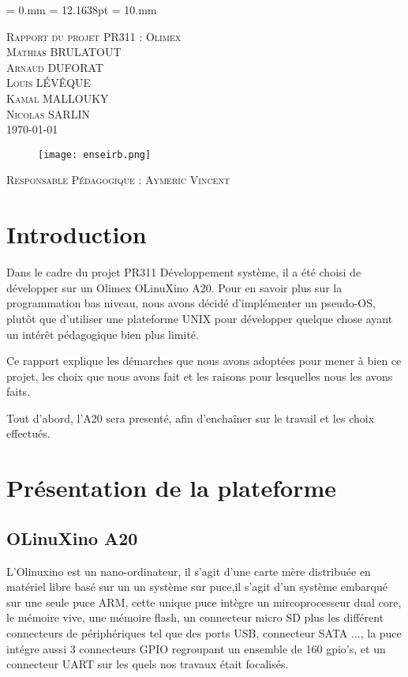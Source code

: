 \documentclass[frenchb]{article}
\begin{document}
\topmargin        = 0.mm
\headheight       = 12.1638pt
\evensidemargin   = 10.mm
\begin{titlepage}
  \begin{center}
    \textsc{\LARGE Rapport du projet PR311 : Olimex}\\[0.5cm]
    \textsc{\Large Mathias BRULATOUT\\ Arnaud DUFORAT\\ Louis L\'EV\^EQUE\\ Kamal MALLOUKY\\ Nicolas SARLIN}\\[1.5cm]
    \textsc{\Large \today }\\[1.5cm]
    \begin{figure}[h!]
      \center
      \texttt{[image: enseirb.png]}
    \end{figure}
    \vspace{1cm}
    \textsc{\Large Responsable Pédagogique : Aymeric Vincent}
  \end{center}  
\end{titlepage}
\section*{Introduction}
Dans le cadre du projet PR311 Développement système, il a été choisi de développer sur un Olimex OLinuXino A20. Pour en savoir plus sur la programmation bas niveau, nous avons décidé d'implémenter un pseudo-OS,  plutôt que d'utiliser une plateforme UNIX pour développer quelque chose ayant un intérêt pédagogique bien plus limité.

Ce rapport explique les démarches que nous avons adoptées pour mener à bien ce projet, les choix que nous avons fait et les raisons pour lesquelles nous les avons faits.

Tout d'abord, l'A20 sera presenté, afin d'enchaîner sur le travail et les choix effectués.
\clearpage
\section{Présentation de la plateforme}

\subsection{OLinuXino A20}
 L'Olinuxino est un nano-ordinateur, il s'agit d'une carte mère distribuée en matériel libre basé sur un un système sur 
 puce,il s'agit d'un système embarqué sur une seule puce ARM, cette unique puce intègre un mircoprocesseur dual core, 
 le mémoire vive, une mémoire flash, un connecteur micro SD plus les différent connecteurs de périphériques tel que des 
 ports USB, connecteur SATA ..., la puce intégre aussi 3 connecteurs GPIO regroupant un ensemble de 160 gpio's, 
 et un connecteur UART sur les quels nos travaux était focalisés.
\end{document}
